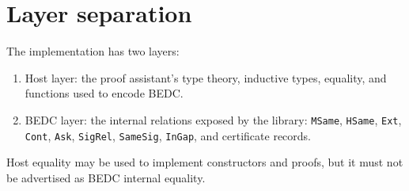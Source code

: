 \section{Layer separation}

The implementation has two layers:
\begin{enumerate}
\item Host layer: the proof assistant's type theory, inductive types, equality, and functions used to encode BEDC.
\item BEDC layer: the internal relations exposed by the library: \texttt{MSame}, \texttt{HSame}, \texttt{Ext}, \texttt{Cont}, \texttt{Ask}, \texttt{SigRel}, \texttt{SameSig}, \texttt{InGap}, and certificate records.
\end{enumerate}
Host equality may be used to implement constructors and proofs, but it must not be advertised as BEDC internal equality.
